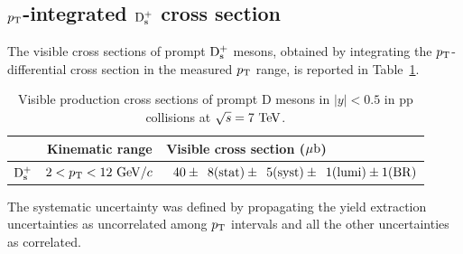 \subsection{$p_{\rm T}$-integrated ${\rm D_s^+}$ cross section}
\label{sec:ppDsXsecPtint}
The visible cross sections of prompt ${\rm D_s^+}$ mesons, obtained by integrating
the $p_{\rm T}$-differential cross section in the measured $p_{\rm T}$ range, is reported
in Table~\ref{tab:ptintegcs}.
\begin{table}[!h]
\centering
\begin{tabular}{c|c|l} 
 & Kinematic range & Visible cross section ($\mathrm{\mu b}$) \\
\hline
\rule{0pt}{12pt} 
${\rm D_s^+}$     & $2<p_{\rm T}<12~\mathrm{GeV}/c$ & $\phantom{0}40 \pm \phantom{0}8 ({\rm stat}) \pm \phantom{0}5 ({\rm syst}) \pm \phantom{0}1 ({\rm lumi}) \pm 1 ({\rm BR})$\\[1ex]
\hline
\end{tabular}
\caption{Visible production cross sections of prompt D mesons in $|y| < 0.5$ in pp collisions at $\sqrt{s} = 7~\mathrm{TeV}$.}
\label{tab:ptintegcs}
\end{table}
The systematic uncertainty was defined by propagating the yield extraction uncertainties as uncorrelated among $p_{\rm T}$ intervals and all the other uncertainties 
as correlated.

